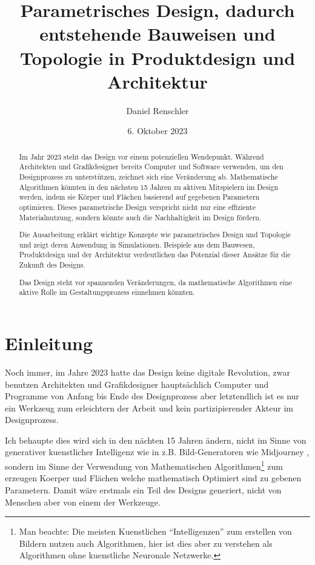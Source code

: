 \documentclass{article}
\author{Daniel Renschler}
\title{Parametrisches Design, dadurch entstehende Bauweisen und Topologie in Produktdesign und Architektur}
\date{6. Oktober 2023}
\begin{document}
\maketitle


\begin{abstract}
Im Jahr 2023 steht das Design vor einem potenziellen Wendepunkt. Während
Architekten und Grafikdesigner bereits Computer und Software verwenden, um den
Designprozess zu unterstützen, zeichnet sich eine Veränderung ab. Mathematische
Algorithmen könnten in den nächsten 15 Jahren zu aktiven Mitspielern im Design
werden, indem sie Körper und Flächen basierend auf gegebenen Parametern
optimieren. Dieses parametrische Design verspricht nicht nur eine effiziente
Materialnutzung, sondern könnte auch die Nachhaltigkeit im Design fördern.

Die Ausarbeitung erklärt wichtige Konzepte wie parametrisches Design und Topologie und
zeigt deren Anwendung in Simulationen. Beispiele aus dem Bauwesen,
Produktdesign und der Architektur verdeutlichen das Potenzial dieser Ansätze
für die Zukunft des Designs.

Das Design steht vor spannenden Veränderungen, da mathematische Algorithmen
eine aktive Rolle im Gestaltungsprozess einnehmen könnten.
\end{abstract}
\thispagestyle{empty}

\clearpage
\tableofcontents  

\newpage
\section{Einleitung}
Noch immer, im Jahre 2023 hatte das Design keine digitale Revolution, zwar benutzen 
Architekten und Grafikdesigner haupts\"achlich Computer und Programme von Anfang bis 
Ende des Designprozess aber letztendlich ist es nur ein Werkzeug zum erleichtern der 
Arbeit und kein partizipierender Akteur im Designprozess.

Ich behaupte dies wird sich in den n\"achten 15 Jahren \"andern, nicht im Sinne von
generativer kuenstlicher Intelligenz wie in z.B. Bild-Generatoren wie Midjourney
\parencite{oppenlaender2022}, sondern im Sinne der Verwendung von Mathematischen
Algorithmen\footnote{Man beachte: Die meisten Kuenstlichen ``Intelligenzen''
zum erstellen von Bildern nutzen auch Algorithmen, hier ist dies aber zu
verstehen als Algorithmen ohne kuenstliche Neuronale Netzwerke.} zum erzeugen
Koerper und Fl\"achen welche mathematisch Optimiert sind zu gebenen Parametern.
Damit w\"are erstmals ein Teil des Designs generiert, nicht von Menschen aber von 
einem der Werkzeuge.
\end{document}
